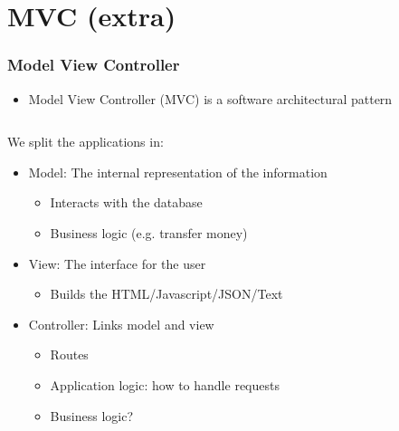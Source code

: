 \documentclass[fleqn,aspectratio=169,10pt]{beamer}
\begin{document}
\section{MVC (extra)}

\begin{frame}[fragile]
  \frametitle{Model View Controller}
  \pause
  \begin{itemize}
    \item Model View Controller (MVC) is a software architectural pattern
  \end{itemize}
  \pause
  \vspace*{-2ex}

  \begin{columns}
    \begin{column}{.6\linewidth}
      \begin{block}{We split the applications in:}
        \begin{itemize}
          \item Model: The internal representation of the information
                \begin{itemize}
                  \item Interacts with the database
                  \item Business logic (e.g. transfer money)
                \end{itemize}
          \item View: The interface for the user
                \begin{itemize}
                  \item Builds the HTML/Javascript/JSON/Text
                \end{itemize}
          \item Controller: Links model and view
                \begin{itemize}
                  \item Routes
                  \item Application logic: how to handle requests
                        \pause
                  \item Business logic?
                \end{itemize}
        \end{itemize}
      \end{block}
    \end{column}
    \begin{column}{.4\linewidth}
      \begin{figure}[]
        \centering

\end{figure}
\end{column}
\end{columns}
\end{frame}
\end{document}
